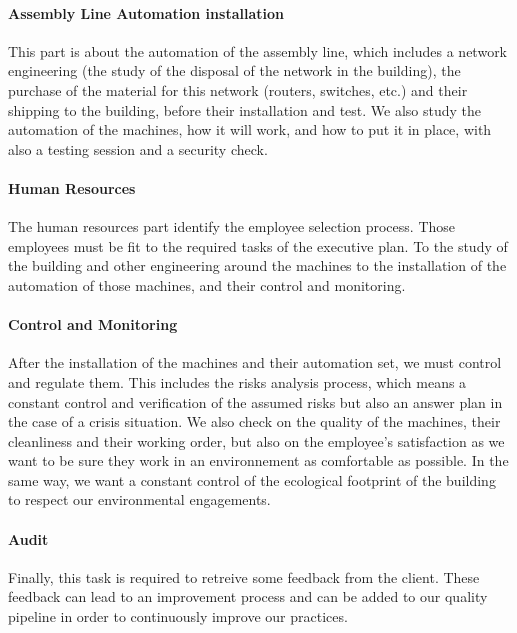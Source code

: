\paragraph{Assembly Line Automation installation} This part is about the automation of the assembly line, which includes a network engineering (the study of the disposal of the network in the building), the purchase
of the material for this network (routers, switches, etc.) and their shipping to the building, before their installation and test. 
We also study the automation of the machines, how it will work, and how to put it in place, with also a testing session and a security check.

\paragraph{Human Resources} The human resources part identify the employee selection process. Those employees 
must be fit to the required tasks of the executive plan. To the study of the building and other engineering around the machines to the 
installation of the automation of those machines, and their control and monitoring. 

\paragraph{Control and Monitoring} After the installation of the machines and their automation set, we must control and regulate them.
This includes the risks analysis process, which means a constant control and verification of the assumed risks but also an answer plan in the case of a crisis situation. 
We also check on the quality of the machines, their cleanliness and their working order, but also on the employee's satisfaction as we want to be sure they
work in an environnement as comfortable as possible. 
In the same way, we want a constant control of the ecological footprint of the building to respect our environmental engagements.   

\paragraph{Audit} Finally, this task is required to retreive some feedback from the client.
These feedback can lead to an improvement process and can be added to our quality pipeline in order to continuously improve our practices.

